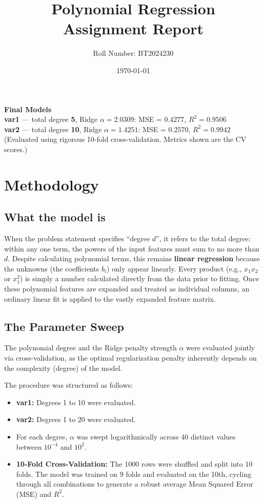 \documentclass[12pt,a4paper]{article}
\title{\textbf{Polynomial Regression}\\ \large Assignment Report}
\author{Roll Number: BT2024230}
\date{\today}
\begin{document}
\maketitle

\begin{tcolorbox}[colback=white, colframe=black, sharp corners]
\textbf{Final Models}\\
\textbf{var1} — total degree \textbf{5}, Ridge $\alpha = 2.0309$: \quad MSE = $0.4277$, \quad $R^2 = 0.9506$\\
\textbf{var2} — total degree \textbf{10}, Ridge $\alpha = 1.4251$: \quad MSE = $0.2570$, \quad $R^2 = 0.9942$\\[1ex]
\footnotesize{(Evaluated using rigorous 10-fold cross-validation. Metrics shown are the CV scores.)}
\end{tcolorbox}

\section{Methodology}

\subsection{What the model is}
When the problem statement specifies ``degree $d$'', it refers to the total degree: within any one term, the powers of the input features must sum to no more than $d$. Despite calculating polynomial terms, this remains \textbf{linear regression} because the unknowns (the coefficients $b_i$) only appear linearly. Every product (e.g., $x_1 x_2$ or $x_1^2$) is simply a number calculated directly from the data prior to fitting. Once these polynomial features are expanded and treated as individual columns, an ordinary linear fit is applied to the vastly expanded feature matrix.

\subsection{The Parameter Sweep}
The polynomial degree and the Ridge penalty strength $\alpha$ were evaluated jointly via cross-validation, as the optimal regularization penalty inherently depends on the complexity (degree) of the model. 

The procedure was structured as follows:
\begin{itemize}
    \item \textbf{var1:} Degrees 1 to 10 were evaluated.
    \item \textbf{var2:} Degrees 1 to 20 were evaluated.
    \item For each degree, $\alpha$ was swept logarithmically across 40 distinct values between $10^{-4}$ and $10^{2}$. 
    \item \textbf{10-Fold Cross-Validation:} The 1000 rows were shuffled and split into 10 folds. The model was trained on 9 folds and evaluated on the 10th, cycling through all combinations to generate a robust average Mean Squared Error (MSE) and $R^2$.
\end{itemize}
\end{document}
